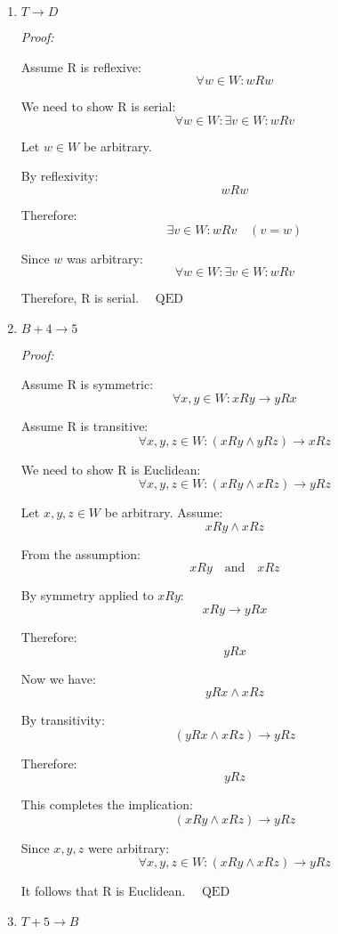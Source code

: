 \documentclass[12pt,a4paper,openany]{article}
\begin{document}
\begin{enumerate}
    \item \textbf{$T \to D$}
    
    \textit{Proof:}
    
    Assume R is reflexive:
    $$\forall w \in W: wRw$$
    
    We need to show R is serial:
    $$\forall w \in W: \exists v \in W: wRv$$
    
    Let $w \in W$ be arbitrary.
    
    By reflexivity:
    $$wRw$$
    
    Therefore:
    $$\exists v \in W: wRv \quad (v = w)$$
    
    Since $w$ was arbitrary:
    $$\forall w \in W: \exists v \in W: wRv$$
    
    Therefore, R is serial. $\quad \text{QED}$
    
    \item \textbf{$B + 4 \to 5$}
    
    \textit{Proof:}
    
    Assume R is symmetric:
    $$\forall x, y \in W: xRy \to yRx$$
    
    Assume R is transitive:
    $$\forall x, y, z \in W: (xRy \land yRz) \to xRz$$
    
    We need to show R is Euclidean:
    $$\forall x, y, z \in W: (xRy \land xRz) \to yRz$$
    
    Let $x, y, z \in W$ be arbitrary. Assume:
    $$xRy \land xRz$$
    
    From the assumption:
    $$xRy \quad \text{and} \quad xRz$$
    
    By symmetry applied to $xRy$:
    $$xRy \to yRx$$
    
    Therefore:
    $$yRx$$
    
    Now we have:
    $$yRx \land xRz$$
    
    By transitivity:
    $$(yRx \land xRz) \to yRz$$
    
    Therefore:
    $$yRz$$
    
    This completes the implication:
    $$(xRy \land xRz) \to yRz$$
    
    Since $x, y, z$ were arbitrary:
    $$\forall x, y, z \in W: (xRy \land xRz) \to yRz$$
    
    It follows that R is Euclidean. $\quad \text{QED}$
    
    \item \textbf{$T + 5 \to B$}
    

\end{enumerate}
\end{document}
